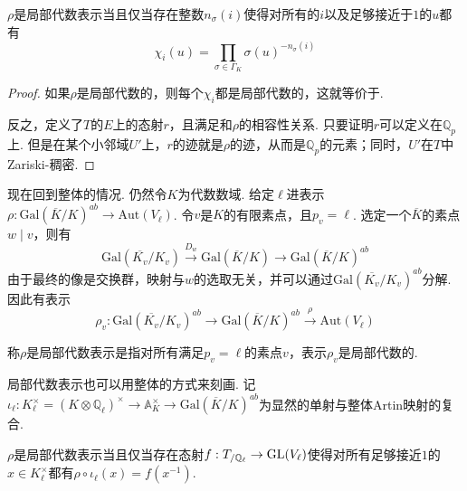 \begin{cprop}
    $\rho$是局部代数表示当且仅当存在整数$n_{\sigma}(i)$使得对所有的$i$以及足够接近于$1$的$u$都有
    \begin{equation}
        \chi_i(u) = \prod_{\sigma\in \Gamma_K} \sigma(u)^{-n_{\sigma}(i)} \label{eqns::temp::1}
    \end{equation}
\end{cprop}

\begin{proof}
    如果$\rho$是局部代数的，则每个$\chi_i$都是局部代数的，这就等价于.

    反之，定义了$T$的$E$上的态射$r$，且满足和$\rho$的相容性关系. 只要证明$r$可以定义在$\mathbb{Q}_p$上. 但是在某个小邻域$U'$上，$r$的迹就是$\rho$的迹，从而是$\mathbb{Q}_p$的元素；同时，$U'$在$T$中Zariski-稠密.
\end{proof}

现在回到整体的情况. 仍然令$K$为代数数域. 给定$\ell$进表示$\rho: \mathrm{Gal}(\overline{K}/K)^{ab}\to \mathrm{Aut}(V_{\ell})$. 令$v$是$K$的有限素点，且$p_v = \ell$. 选定一个$\overline{K}$的素点$w\mid v$，则有
\begin{equation}
    \mathrm{Gal}(\overline{K_v}/K_v) \xrightarrow{D_{w}} \mathrm{Gal}(\overline{K}/K) \to \mathrm{Gal}(\overline{K}/K)^{ab}
\end{equation}
由于最终的像是交换群，映射与$w$的选取无关，并可以通过$\mathrm{Gal}(\overline{K_v}/K_v)^{ab}$分解. 因此有表示
\begin{equation}
    \rho_v: \mathrm{Gal}(\overline{K_v}/K_v)^{ab} \to \mathrm{Gal}(\overline{K}/K)^{ab} \xrightarrow{\rho} \mathrm{Aut}(V_{\ell})
\end{equation}

\begin{cdef}
    称$\rho$是局部代数表示是指对所有满足$p_v=\ell$的素点$v$，表示$\rho_v$是局部代数的.
\end{cdef}

局部代数表示也可以用整体的方式来刻画. 记$\iota_{\ell}: K_{\ell}^{\times}=(K\otimes \mathbb{Q}_{\ell})^{\times} \to \mathbb{A}_{K}^{\times} \to \mathrm{Gal}(\overline{K}/K)^{ab}$为显然的单射与整体Artin映射的复合.

\begin{cprop}
    $\rho$是局部代数表示当且仅当存在态射$f: {T}_{/\mathbb{Q}_{\ell}} \to \mathrm{GL}(V_{\ell})$使得对所有足够接近$1$的$x\in K_{\ell}^{\times}$都有$\rho\circ \iota_{\ell}(x) = f(x^{-1})$.
\end{cprop}

